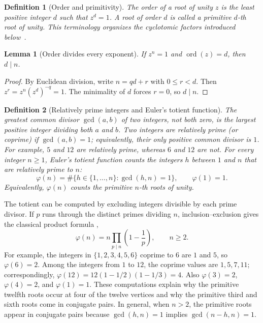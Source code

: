 \documentclass[11pt,a4paper]{article}
\numberwithin{equation}{section}
\theoremstyle{uprightpaper}
\newtheorem{lemma}{Lemma}[section]
\newtheorem{definition}{Definition}[section]
\newcommand{\ord}{\operatorname{ord}}
\begin{document}
\begin{definition}[Order and primitivity]\label{def:order}
The \emph{order} of a root of unity $z$ is the least positive integer $d$ such that $z^d=1$. A root of order $d$ is called a \emph{primitive $d$-th root of unity}. This terminology organizes the cyclotomic factors introduced below~\cite{hardywright2008,irelandrosen1990}.
\end{definition}
\begin{lemma}[Order divides every exponent]\label{lem:order-divides}
If $z^n=1$ and $\ord(z)=d$, then $d\mid n$.
\end{lemma}
\begin{proof}
By Euclidean division, write $n=qd+r$ with $0\leq r<d$. Then $z^r=z^n(z^d)^{-q}=1$. The minimality of $d$ forces $r=0$, so $d\mid n$.
\end{proof}


\begin{definition}[Relatively prime integers and Euler's totient function]\label{def:totient}
The greatest common divisor $\gcd(a,b)$ of two integers, not both zero, is the largest positive integer dividing both $a$ and $b$. Two integers are \emph{relatively prime} (or \emph{coprime}) if $\gcd(a,b)=1$; equivalently, their only positive common divisor is $1$. For example, $5$ and $12$ are relatively prime, whereas $6$ and $12$ are not. For every integer $n\geq1$, Euler's totient function counts the integers $h$ between $1$ and $n$ that are relatively prime to $n$:
\begin{equation}\label{eq:totient-def}
\varphi(n)=\#\{h\in\{1,\ldots,n\}:\gcd(h,n)=1\}, \qquad\varphi(1)=1.
\end{equation}
Equivalently, $\varphi(n)$ counts the primitive $n$-th roots of unity.
\end{definition}

The totient can be computed by excluding integers divisible by each prime divisor. If $p$ runs through the distinct primes dividing $n$, inclusion--exclusion gives the classical product formula \cite{hardywright2008, irelandrosen1990, apostol1976}, 
\begin{equation}\label{eq:totient-product}
\varphi(n)=n\prod_{p\mid n}\left(1-\frac1p\right),\qquad n\geq2.
\end{equation}
For example, the integers in $\{1,2,3,4,5,6\}$ coprime to $6$ are $1$ and $5$, so $\varphi(6)=2$. Among the integers from $1$ to $12$, the coprime values are $1,5,7,11$; correspondingly, $\varphi(12)=12(1-1/2)(1-1/3)=4$. Also $\varphi(3)=2$, $\varphi(4)=2$, and $\varphi(1)=1$. These computations explain why the primitive twelfth roots occur at four of the twelve vertices and why the primitive third and sixth roots come in conjugate pairs. In general, when $n>2$, the primitive roots appear in conjugate pairs because $\gcd(h,n)=1$ implies $\gcd(n-h,n)=1$.
\end{document}
